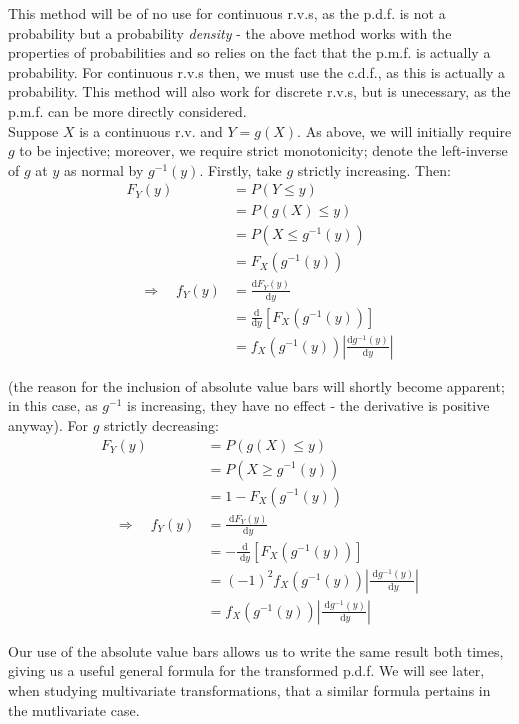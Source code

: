 \documentclass[12pt,a4paper]{article}
\newcommand{\imply}{\quad\Rightarrow\quad}
\newcommand{\diff}{\;\mathrm{d}}
\renewcommand{\imply}{\quad\Rightarrow\quad}
\begin{document}
This method will be of no use for continuous r.v.s, as the p.d.f. is not a probability but a probability {\it density} - the above method works with the properties of probabilities and so relies on the fact that the p.m.f. is actually a probability. For continuous r.v.s then, we must use the c.d.f., as this is actually a probability. This method will also work for discrete r.v.s, but is unecessary, as the p.m.f. can be more directly considered.\\
\indent Suppose $X$ is a continuous r.v. and $Y = g(X)$. As above, we will initially require $g$ to be injective; moreover, we require strict monotonicity; denote the left-inverse of $g$ at $y$ as normal by $g^{-1}(y)$. Firstly, take $g$ strictly increasing. Then:
\begin{align*}
F_Y(y) &= P(Y \leq y)\\
&= P(g(X) \leq y)\\
&= P\left(X \leq g^{-1}(y)\right)\\
&= F_X\left(g^{-1}(y)\right)\\
\imply f_Y(y) &= \frac{\mathrm{d}F_Y(y)}{\mathrm{d}y}\\
&= \frac{\mathrm{d}}{\mathrm{d}y}\left[F_X\left(g^{-1}(y)\right)\right]\\
&= f_X\left(g^{-1}(y)\right) \left|\frac{\mathrm{d}g^{-1}(y)}{\mathrm{d}y}\right|
\end{align*}

(the reason for the inclusion of absolute value bars will shortly become apparent; in this case, as $g^{-1}$ is increasing, they have no effect - the derivative is positive anyway). For $g$ strictly decreasing:
\begin{align*}
F_Y(y) &= P(g(X)\leq y)\\
&= P(X\geq g^{-1}(y))\\
&= 1 - F_X(g^{-1}(y))\\
\imply f_Y(y) &= \frac{\diff F_Y(y)}{\diff y}\\
&= -\frac{\diff}{\diff y}\left[F_X(g^{-1}(y))\right]\\
&= (-1)^2 f_X(g^{-1}(y))\left| \frac{\diff g^{-1}(y)}{\diff y}\right| \\
&= f_X(g^{-1}(y))\left|\frac{\diff g^{-1}(y)}{\diff y}\right|
\end{align*}

Our use of the absolute value bars allows us to write the same result both times, giving us a useful general formula for the transformed p.d.f. We will see later, when studying multivariate transformations, that a similar formula pertains in the mutlivariate case.
\end{document}

